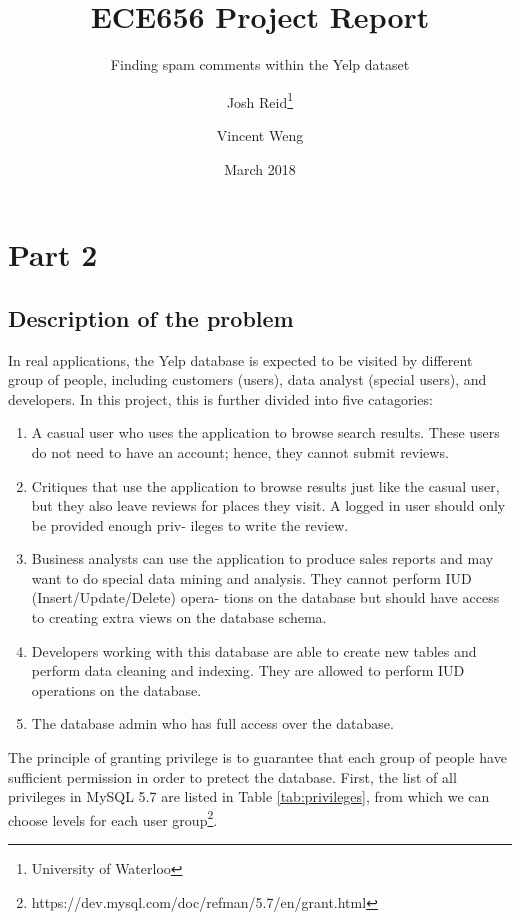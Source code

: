 \documentclass[12pt]{scrbook}
\title{ECE656 Project Report}
\subtitle{Finding spam comments within the Yelp dataset}
\date{March 2018}
\author{Josh Reid\thanks{University of Waterloo}
\and Vincent Weng\footnotemark[1]}
\begin{document}
\section{Part 2}
\subsection{Description of the problem}
    In real applications, the Yelp database is expected to be visited by different group of people, including customers (users), data analyst (special users), and developers. In this project, this is further divided into five catagories:
    \begin{enumerate}
      \item A casual user who uses the application to browse search results. These users do not need to have an account; hence, they cannot submit reviews.
      \item Critiques that use the application to browse results just like the casual user, but they also leave reviews for places they visit. A logged in user should only be provided enough priv- ileges to write the review.
      \item Business analysts can use the application to produce sales reports and may want to do special data mining and analysis. They cannot perform IUD (Insert/Update/Delete) opera- tions on the database but should have access to creating extra views on the database schema.
      \item Developers working with this database are able to create new tables and perform data cleaning and indexing. They are allowed to perform IUD operations on the database.
      \item The database admin who has full access over the database.
    \end{enumerate} 

    The principle of granting privilege is to guarantee that each group of people have sufficient permission in order to pretect the database. First, the list of all privileges in MySQL 5.7 are listed in Table \ref{tab:privileges}, from which we can choose levels for each user group\footnote{https://dev.mysql.com/doc/refman/5.7/en/grant.html}. 
\end{document}
